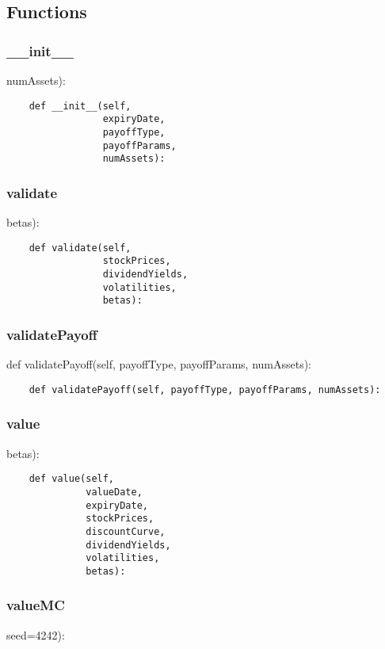 \documentclass[twoside,11pt]{book}
\begin{document}
\subsection*{Functions}

\subsubsection*{{\bf \_\_init\_\_}}
numAssets): 

\begin{lstlisting}
    def __init__(self,
                 expiryDate,
                 payoffType,
                 payoffParams,
                 numAssets):
\end{lstlisting}

\subsubsection*{{\bf validate}}
betas): 

\begin{lstlisting}
    def validate(self,
                 stockPrices,
                 dividendYields,
                 volatilities,
                 betas):
\end{lstlisting}

\subsubsection*{{\bf validatePayoff}}
def validatePayoff(self, payoffType, payoffParams, numAssets): 

\begin{lstlisting}
    def validatePayoff(self, payoffType, payoffParams, numAssets):
\end{lstlisting}

\subsubsection*{{\bf value}}
betas): 

\begin{lstlisting}
    def value(self, 
              valueDate, 
              expiryDate, 
              stockPrices, 
              discountCurve,
              dividendYields, 
              volatilities, 
              betas):
\end{lstlisting}

\subsubsection*{{\bf valueMC}}
seed=4242): 
\end{document}
